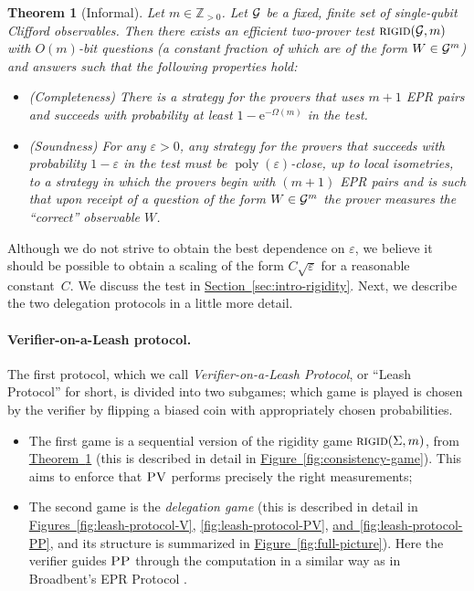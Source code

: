 \documentclass[11pt]{article}
\numberwithin{equation}{section}
\newtheorem{theorem}{Theorem}[section]
\theoremstyle{definition}
\theoremstyle{plain}
\newcommand{\eee}{\mathrm e}
\newcommand{\expref}[2]{\hyperref[#2]{#1~\ref{#2}}}
\DeclareMathOperator{\poly}{poly}
\newcommand{\eps}{\varepsilon}
\newcommand{\rigid}{\textsc{rigid}}
\newcommand{\pv}{\textsc{PV}}
\newcommand{\pp}{\textsc{PP}}
\begin{document}
\begin{theorem}[Informal]\label{thm:rigid-informal}
Let $m\in\mathbb{Z}_{>0}$. Let $\cal G$ be a fixed, finite set of single-qubit Clifford observables. Then there exists an efficient two-prover test $\textsc{rigid}({\cal G},m)$ with $O(m)$-bit questions (a constant fraction of which are of the form $W\in{\cal G}^m$) and answers such that the following properties hold:
\begin{itemize}[nolistsep]
\item (Completeness) There is a strategy for the provers that uses $m+1$ EPR pairs and succeeds with probability at least $1 - \eee^{-\Omega(m)}$ in the test.
\item (Soundness) For any $\eps>0$, any strategy for the provers that succeeds with probability $1-\eps$ in the test must be $\poly(\eps)$-close, up to local isometries, to a strategy in which the provers begin with $(m+1)$ EPR pairs and is such that upon receipt of a question of the form $W\in {\cal G}^m$ the prover measures the ``correct'' observable $W$. 
\end{itemize}
\end{theorem}

Although we do not strive to obtain the best dependence on $\eps$, we believe it
should be possible to obtain a scaling of the form $C\sqrt{\eps}$ for a
reasonable constant~$C$. We discuss the test in \expref{Section}{sec:intro-rigidity}. Next, we describe the two delegation protocols in a little more detail.

\paragraph{Verifier-on-a-Leash protocol.}  %
The first protocol, which we call \emph{Verifier-on-a-Leash
Protocol}, or ``Leash Protocol'' for short, is divided into two subgames; which game is played is chosen by the verifier by flipping a biased coin with appropriately chosen probabilities.
\begin{itemize}[nolistsep]
\item The first game is a sequential version of the rigidity game $\rigid(\Sigma,m)$, from \expref{Theorem}{thm:rigid-informal} (this is described in detail in \expref{Figure}{fig:consistency-game}). This aims to enforce that $\pv$ performs precisely the right measurements;
\item The second game is the \emph{delegation game} (this is described in detail in \expref{Figures}{fig:leash-protocol-V}, \ref{fig:leash-protocol-PV}, \expref{and}{fig:leash-protocol-PP}, and its structure is summarized in \expref{Figure}{fig:full-picture}). Here the verifier guides $\pp$ through the computation in a similar way as in Broadbent's EPR Protocol \cite{broadbent15howtoverify}.
\end{itemize}
\end{document}
